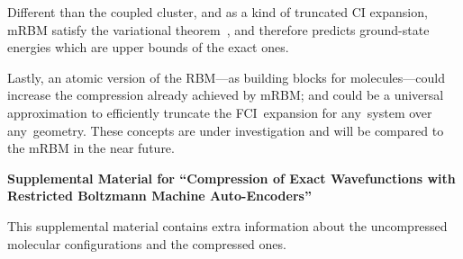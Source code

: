 \documentclass[%
 amsmath,amssymb,
 aps,prl, %
 reprint,%
]{revtex4-1}
\begin{document}
\indent Different than the coupled cluster, and as a kind of truncated CI expansion, mRBM satisfy the variational theorem~\cite{Szabo1989, Mayer2003,Helgaker2000,Sherrill1999,Shankar1994}, and therefore predicts ground-state energies which are upper bounds of the exact ones. 

\indent Lastly, an atomic version of the RBM---as building blocks for molecules---could increase the compression already achieved by mRBM; and could be a universal approximation to efficiently truncate the FCI~expansion for any~system over any~geometry. These concepts are under investigation and will be compared to the mRBM in the near future. 



\newpage
\widetext
\begin{center}
\textbf{\large Supplemental Material for ``Compression of Exact Wavefunctions with Restricted Boltzmann Machine Auto-Encoders''}
\end{center}
\setcounter{equation}{0}
\setcounter{figure}{0}
\setcounter{table}{0}
\makeatletter
\renewcommand{\theequation}{S\arabic{equation}}
\renewcommand{\thefigure}{S\arabic{figure}}
\renewcommand{\thetable}{S\arabic{table}}
\renewcommand{\bibnumfmt}[1]{[S#1]}
\renewcommand{\citenumfont}[1]{S#1}

This supplemental material contains extra information about the uncompressed molecular configurations and the compressed ones.
\end{document}
